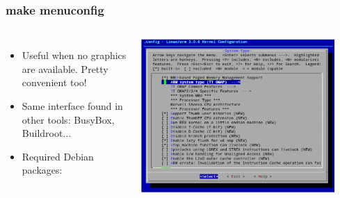 \begin{frame}
  \frametitle{make menuconfig}
  \begin{columns}
    \begin{itemize}
      \item Useful when no graphics are available. Pretty convenient too!
      \item Same interface found in other tools: BusyBox, Buildroot...
      \item Required Debian packages: 
    \end{itemize}
    \includegraphics[width=0.9\textwidth]{slides/sysdev-linux-intro-configuration/menuconfig-screenshot.png}
  \end{columns}
\end{frame}

